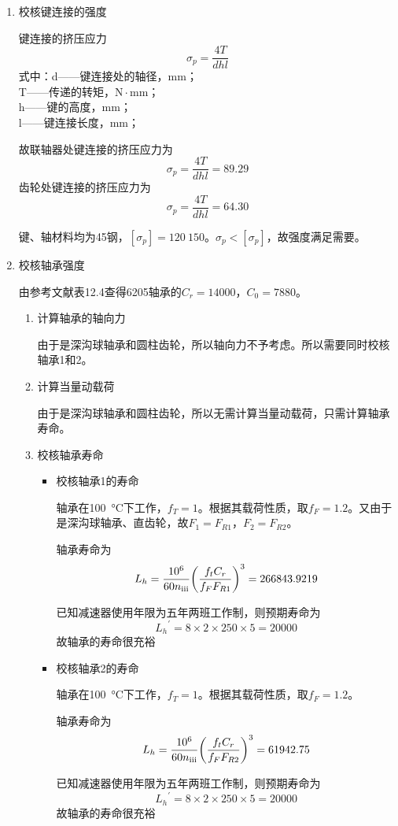 \begin{enumerate}[A]
	\item 校核键连接的强度
	\par 键连接的挤压应力\\$$\sigma_p=\dfrac{4T}{dhl}$$
	式中：d——键连接处的轴径，mm；\\
	T——传递的转矩，$\mathrm{N}\cdot \mathrm{mm}$；\\
	h——键的高度，mm；\\
	l——键连接长度，mm；
	\par 故联轴器处键连接的挤压应力为$$\sigma_p=\dfrac{4T}{dhl}=89.29$$齿轮处键连接的挤压应力为$$\sigma_p=\dfrac{4T}{dhl}=64.30$$
	\par 键、轴材料均为45钢，$\left[\sigma_p\right]= 120~150$。$\sigma_p<\left[\sigma_p\right]$，故强度满足需要。
	\item 校核轴承强度
	\par 由参考文献\cite{1}表12.4查得6205轴承的$C_r=14000$，$C_0=7880$。
	\begin{enumerate}[a]
		\item 计算轴承的轴向力
		\par 由于是深沟球轴承和圆柱齿轮，所以轴向力不予考虑。所以需要同时校核轴承1和2。
		\item 计算当量动载荷
		\par 由于是深沟球轴承和圆柱齿轮，所以无需计算当量动载荷，只需计算轴承寿命。
		\item 校核轴承寿命
		\begin{itemize}
			\item 校核轴承1的寿命
			\par 轴承在\SI{100}{\degreeCelsius}下工作，$f_T=1$。根据其载荷性质，取$f_F=1.2$。又由于是深沟球轴承、直齿轮，故$F_1=F_{R1}$，$F_2=F_{R2}$。
			\par 轴承寿命为
			$$L_h=\dfrac{10^6}{60n_{\mathrm{\uppercase\expandafter{\romannumeral3}}}}{\left(\dfrac{f_tC_r}{f_FF_{R1}}\right)}^3=266843.9219$$
			\par 已知减速器使用年限为五年两班工作制，则预期寿命为
			$${L_h}^{\prime}=8\times 2\times 250\times 5=20000$$
			故轴承的寿命很充裕
			\item 校核轴承2的寿命
			\par 轴承在\SI{100}{\degreeCelsius}下工作，$f_T=1$。根据其载荷性质，取$f_F=1.2$。
			\par 轴承寿命为
			$$L_h=\dfrac{10^6}{60n_{\mathrm{\uppercase\expandafter{\romannumeral3}}}}{\left(\dfrac{f_tC_r}{f_FF_{R2}}\right)}^3=61942.75$$
			\par 已知减速器使用年限为五年两班工作制，则预期寿命为
			$${L_h}^{\prime}=8\times 2\times 250\times 5=20000$$
			故轴承的寿命很充裕
		\end{itemize}
	\end{enumerate}
\end{enumerate}